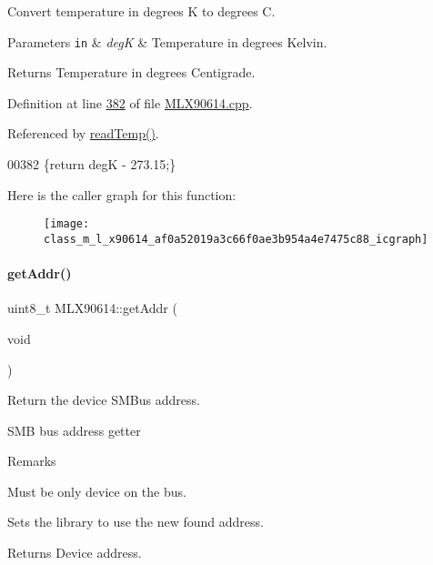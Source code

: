 Convert temperature in degrees K to degrees C. 


\begin{DoxyParams}[1]{Parameters}
\mbox{\tt in}  & {\em degK} & Temperature in degrees Kelvin. \\
\hline
\end{DoxyParams}
\begin{DoxyReturn}{Returns}
Temperature in degrees Centigrade. 
\end{DoxyReturn}


Definition at line \mbox{\hyperlink{_m_l_x90614_8cpp_source_l00382}{382}} of file \mbox{\hyperlink{_m_l_x90614_8cpp_source}{M\+L\+X90614.\+cpp}}.



Referenced by \mbox{\hyperlink{_m_l_x90614_8cpp_source_l00084}{read\+Temp()}}.


\begin{DoxyCode}
00382 \{\textcolor{keywordflow}{return} degK - 273.15;\}
\end{DoxyCode}
Here is the caller graph for this function\+:\nopagebreak
\begin{figure}[H]
\begin{center}
\leavevmode
\texttt{[image: class\_m\_l\_x90614\_af0a52019a3c66f0ae3b954a4e7475c88\_icgraph]}
\end{center}
\end{figure}
\mbox{\label{class_m_l_x90614_a7ba22b140f92bea70381cf3c495d4c72}} 
\paragraph{\texorpdfstring{get\+Addr()}{getAddr()}}
{\footnotesize\ttfamily uint8\+\_\+t M\+L\+X90614\+::get\+Addr (\begin{DoxyParamCaption}\item[{void}]{ }\end{DoxyParamCaption})\hspace{0.3cm}{\ttfamily [private]}}



Return the device S\+M\+Bus address. 

S\+MB bus address getter

\begin{DoxyRemark}{Remarks}
\begin{DoxyItemize}
\item Must be only device on the bus. \item Sets the library to use the new found address. \end{DoxyItemize}

\end{DoxyRemark}
\begin{DoxyReturn}{Returns}
Device address. 
\end{DoxyReturn}


